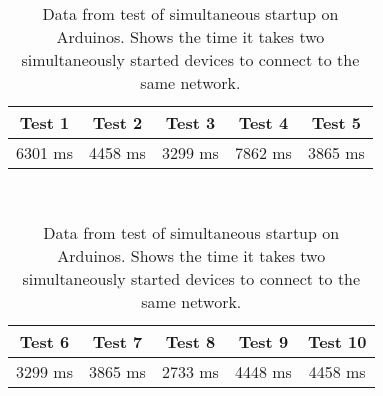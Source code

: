 \begin{table}[H]
\centering\footnotesize
\begin{tabular}{c | c | c | c | c }
Test 1 & Test 2 & Test 3 & Test 4 & Test 5 \\\midrule
6301 ms & 4458 ms & 3299 ms & 7862 ms & 3865 ms \\
\end{tabular}\\
\vspace{15pt}
\begin{tabular}{c | c | c | c | c }
Test 6 & Test 7 & Test 8 & Test 9 & Test 10\\\midrule
3299 ms & 3865 ms & 2733 ms & 4448 ms & 4458 ms \\
\end{tabular}
\caption{Data from test of simultaneous startup on Arduinos. Shows the time it takes two simultaneously started devices to connect to the same network.}
\label{graphConnectime}
\end{table} 